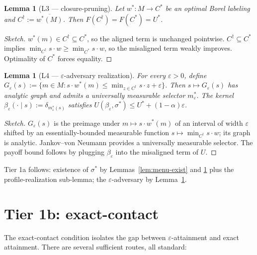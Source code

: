 \documentclass[11pt]{article}
\newtheorem{lemma}[theorem]{Lemma}
\theoremstyle{definition}
\theoremstyle{remark}
\newcommand{\eps}{\varepsilon}
\begin{document}
\begin{lemma}[L3 --- closure-pruning]\label{lem:pruning}
Let $w^*:M\to C^*$ be an optimal Borel labeling and
$C^\dagger := \overline{w^*(M)}$. Then $F(C^\dagger) = F(C^*) = U^*$.
\end{lemma}

\begin{proof}[Sketch]
$w^*(m)\in C^\dagger\subseteq C^*$, so the aligned term is unchanged
pointwise. $C^\dagger\subseteq C^*$ implies
$\min_{C^\dagger}s\cdot w \ge \min_{C^*}s\cdot w$, so the misaligned
term weakly improves. Optimality of $C^*$ forces equality.
\end{proof}

\begin{lemma}[L4 --- $\eps$-adversary realization]\label{lem:eps-adv}
For every $\eps>0$, define
$G_\eps(s) := \{m\in M : s\cdot w^*(m)\le \min_{z\in C^\dagger}s\cdot z + \eps\}$.
Then $s\mapsto G_\eps(s)$ has analytic graph and admits a universally
measurable selector $m_\eps^*$. The kernel
$\beta_\eps(\cdot\mid s) := \delta_{m_\eps^*(s)}$ satisfies
$U(\beta_\eps,\sigma^*) \le U^* + (1-\alpha)\eps$.
\end{lemma}

\begin{proof}[Sketch]
$G_\eps(s)$ is the preimage under $m\mapsto s\cdot w^*(m)$ of an
interval of width $\eps$ shifted by an essentially-bounded measurable
function $s\mapsto\min_{C^\dagger}s\cdot w$; its graph is analytic.
Jankov--von Neumann \cite[Thm.~18.13]{AliprantisBorder2006} provides
a universally measurable selector. The payoff bound follows by
plugging $\beta_\eps$ into the misaligned term of $U$.
\end{proof}

Tier 1a follows: existence of $\sigma^*$ by Lemmas~\ref{lem:menu-exist}
and \ref{lem:pruning} plus the profile-realization sub-lemma; the
$\eps$-adversary by Lemma~\ref{lem:eps-adv}.

\section{Tier 1b: exact-contact}\label{sec:tier1b}

The exact-contact condition isolates the gap between
$\eps$-attainment and exact attainment. There are several
sufficient routes, all standard:
\end{document}
